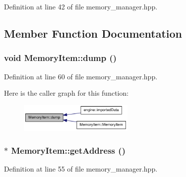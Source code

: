 Definition at line 42 of file memory\_\-manager.hpp.

\subsection{Member Function Documentation}
\hypertarget{struct_memory_item_aa6bd06b9d84d23905f34c40759e0dcba}{
\subsubsection[{dump}]{\setlength{\rightskip}{0pt plus 5cm}void MemoryItem::dump ()}}
\label{struct_memory_item_aa6bd06b9d84d23905f34c40759e0dcba}


Definition at line 60 of file memory\_\-manager.hpp.

Here is the caller graph for this function:\nopagebreak
\begin{figure}[H]
\begin{center}
\leavevmode
\includegraphics[width=157pt]{struct_memory_item_aa6bd06b9d84d23905f34c40759e0dcba_icgraph}
\end{center}
\end{figure}
\hypertarget{struct_memory_item_a8e5271126c1eb7d5d5b0d611149b67cf}{
\subsubsection[{getAddress}]{$\ast$ MemoryItem::getAddress ()}}
\label{struct_memory_item_a8e5271126c1eb7d5d5b0d611149b67cf}


Definition at line 55 of file memory\_\-manager.hpp.

